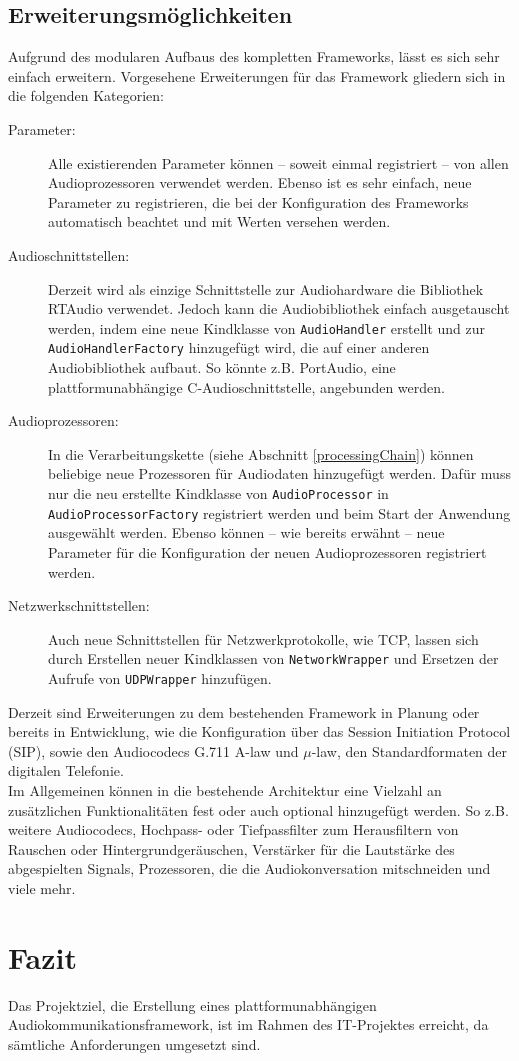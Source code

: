 \subsection{Erweiterungsmöglichkeiten}
Aufgrund des modularen Aufbaus des kompletten Frameworks, lässt es sich sehr einfach erweitern. Vorgesehene Erweiterungen für das Framework gliedern sich in die folgenden Kategorien:
\begin{description}
\item[Parameter:] Alle existierenden Parameter können -- soweit einmal registriert -- von allen Audioprozessoren verwendet werden. Ebenso ist es sehr einfach, neue Parameter zu registrieren, die bei der Konfiguration des Frameworks automatisch beachtet und mit Werten versehen werden.
\item[Audioschnittstellen:] Derzeit wird als einzige Schnittstelle zur Audiohardware die Bibliothek RTAudio verwendet. Jedoch kann die Audiobibliothek einfach ausgetauscht werden, indem eine neue Kindklasse von \texttt{AudioHandler} erstellt und zur \texttt{AudioHandlerFactory} hinzugefügt wird, die auf einer anderen Audiobibliothek aufbaut. So könnte z.B. PortAudio, eine plattformunabhängige C-Audioschnittstelle, angebunden werden.
\item[Audioprozessoren:] In die Verarbeitungskette (siehe Abschnitt \ref{processingChain}) können beliebige neue Prozessoren für Audiodaten hinzugefügt werden. Dafür muss nur die neu erstellte Kindklasse von \texttt{AudioProcessor} in \texttt{AudioProcessorFactory} registriert werden und beim Start der Anwendung ausgewählt werden. Ebenso können -- wie bereits erwähnt -- neue Parameter für die Konfiguration der neuen Audioprozessoren registriert werden.
\item[Netzwerkschnittstellen:] Auch neue Schnittstellen für Netzwerkprotokolle, wie TCP, lassen sich durch Erstellen neuer Kindklassen von \texttt{NetworkWrapper} und Ersetzen der Aufrufe von \texttt{UDPWrapper} hinzufügen.
\end{description}
Derzeit sind Erweiterungen zu dem bestehenden Framework in Planung oder bereits in Entwicklung, wie die Konfiguration über das Session Initiation Protocol (SIP), sowie den Audiocodecs G.711 A-law und $\mu$-law, den Standardformaten der digitalen Telefonie.
\\
Im Allgemeinen können in die bestehende Architektur eine Vielzahl an zusätzlichen Funktionalitäten fest oder auch optional hinzugefügt werden. So z.B. weitere Audiocodecs, Hochpass- oder Tiefpassfilter zum Herausfiltern von Rauschen oder Hintergrundgeräuschen, Verstärker für die Lautstärke des abgespielten Signals, Prozessoren, die die Audiokonversation mitschneiden und viele mehr.

\section{Fazit}
Das Projektziel, die Erstellung eines plattformunabhängigen Audiokommunikationsframework, ist im Rahmen des IT-Projektes erreicht, da sämtliche Anforderungen umgesetzt sind.